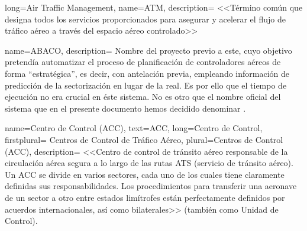 \makeglossaries

%
%
%        
%

%
%
%        
%



{
    long={Air Traffic Management}, %
    name={ATM}, 
    description=
    {
       <<Término común que designa todos los servicios proporcionados para asegurar y acelerar el flujo de tráfico 
       aéreo a través del espacio aéreo controlado>>~\cite{ENAIRE-web}
    }
}

{
    name={ABACO},
    description=
    {   
        Nombre del proyecto previo a este, cuyo objetivo pretendía automatizar el proceso de planificación de controladores aéreos de forma ``estratégica'', es decir, con antelación previa, empleando información de predicción de la sectorización en lugar de la real. Es por ello que el tiempo de ejecución no era crucial en éste sistema.
        No es otro que el nombre oficial del sistema que en el presente documento hemos decidido denominar \legacy{}.
    }
}

{
    name={Centro de Control (ACC)},
    text={ACC},
	long={Centro de Control}, %
	firstplural= {Centros de Control de Tráfico Aéreo},
	plural={Centros de Control (ACC)},
    description=
    {
        <<Centro de control de tránsito aéreo responsable de la circulación aérea segura a lo largo de las rutas ATS 
        (servicio de tránsito aéreo). Un ACC se divide en varios sectores, cada uno de los cuales tiene claramente 
        definidas sus responsabilidades. Los procedimientos para transferir una aeronave de un sector a otro entre 
        estados limítrofes están perfectamente definidos por acuerdos internacionales, así como 
        bilaterales>> (también como Unidad de Control).~\cite{ENAIRE-web}
    }
}

